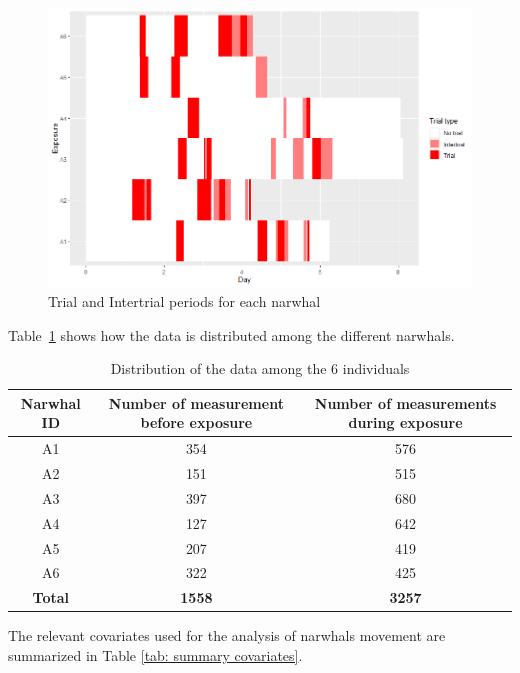 \documentclass[aoas]{imsart}
\theoremstyle{definition}
\theoremstyle{remark}
\theoremstyle{remark}
\newcommand {\1}{\mathbb{1}}
\begin{document}
\begin{figure}[ht!]
	\centering
	\centering
	\includegraphics[scale=0.5]{images/data_exploration/trials.png}
	\caption{Trial and Intertrial periods for each narwhal}
	\label{fig: trials and intertrials distributions}
	
\end{figure}

Table~\ref{table: data distribution}  shows how the data is distributed among the different narwhals.
\begin{table}[ht!]
	\centering
	\begin{tabular}{|c|c|c|}
		\hline
		Narwhal ID & Number of measurement before exposure & Number of measurements during exposure \\
		\hline
		A1 & 354 & 576\\
		\hline
		A2  & 151 & 515 \\
		\hline
		A3 & 397 & 680 \\
		\hline
		A4 & 127 & 642  \\
		\hline
		A5 & 207 & 419\\
		\hline
		A6 & 322 & 425 \\
		\hline
		\textbf{Total} & \textbf{1558} & \textbf{3257} \\
		\hline
	\end{tabular}
	\caption{Distribution of the data among the 6 individuals}
	\label{table: data distribution}
\end{table}


The relevant covariates   used for the analysis of narwhals movement are summarized in Table \ref{tab: summary covariates}.
\end{document}
